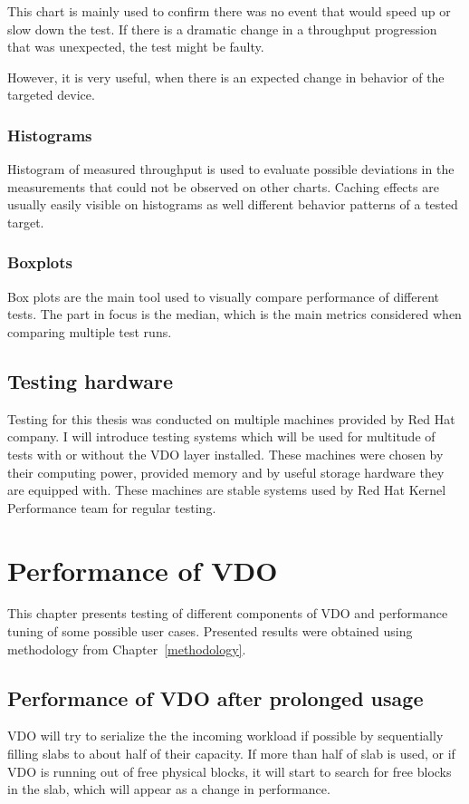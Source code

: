 \documentclass[
  color, %
  table, %
  lof,   %
  lot,   %
]{fithesis3}
\begin{document}

This chart is mainly used to confirm there was no event that would speed up or slow down the test. If there is a dramatic change in a throughput progression that was unexpected, the test might be faulty.

However, it is very useful, when there is an expected change in behavior of the targeted device.

\subsection{Histograms}
Histogram of measured throughput is used to evaluate possible deviations in the measurements that could not be observed on other charts. Caching effects are usually easily visible on histograms as well different behavior patterns of a tested target.

\subsection{Boxplots}
Box plots are the main tool used to visually compare performance of different tests. The part in focus is the median, which is the main metrics considered when comparing multiple test runs.

\section{Testing hardware}
Testing for this thesis was conducted on multiple machines provided by Red Hat company. I will introduce testing systems which will be used for multitude of tests with or without the VDO layer installed. These machines were chosen by their computing power, provided memory and by useful storage hardware they are equipped with. These machines are stable systems used by Red Hat Kernel Performance team for regular testing.



\chapter{Performance of VDO}
\label{testing}
This chapter presents testing of different components of VDO and performance tuning of some possible user cases. Presented results were obtained using methodology from Chapter~\ref{methodology}.

\section{Performance of VDO after prolonged usage}
\label{half}
VDO will try to serialize the the incoming workload if possible by sequentially filling slabs to about half of their capacity. If more than half of slab is used, or if VDO is running out of free physical blocks, it will start to search for free blocks in the slab, which will appear as a change in performance. 
\end{document}
